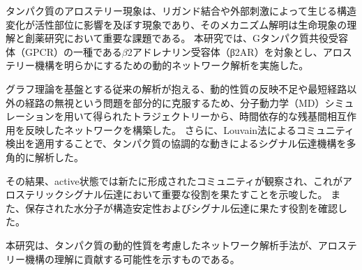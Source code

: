 タンパク質のアロステリー現象は、リガンド結合や外部刺激によって生じる構造変化が活性部位に影響を及ぼす現象であり、そのメカニズム解明は生命現象の理解と創薬研究において重要な課題である。
本研究では、Gタンパク質共役受容体（GPCR）の一種である$\beta$2アドレナリン受容体（β2AR）を対象とし、アロステリー機構を明らかにするための動的ネットワーク解析を実施した。

グラフ理論を基盤とする従来の解析が抱える、動的性質の反映不足や最短経路以外の経路の無視という問題を部分的に克服するため、分子動力学（MD）シミュレーションを用いて得られたトラジェクトリーから、時間依存的な残基間相互作用を反映したネットワークを構築した。
さらに、Louvain法によるコミュニティ検出を適用することで、タンパク質の協調的な動きによるシグナル伝達機構を多角的に解析した。

その結果、active状態では新たに形成されたコミュニティが観察され、これがアロステリックシグナル伝達において重要な役割を果たすことを示唆した。
また、保存された水分子が構造安定性およびシグナル伝達に果たす役割を確認した。

本研究は、タンパク質の動的性質を考慮したネットワーク解析手法が、アロステリー機構の理解に貢献する可能性を示すものである。